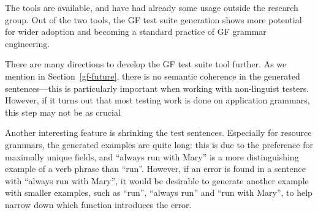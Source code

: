 
The tools are available, and have had already some usage outside the
research group. Out of the two tools, the GF test suite generation
shows more potential for wider adoption and becoming a standard
practice of GF grammar engineering.

There are many directions to develop the GF test suite tool further.
As we mention in Section~\ref{gf-future}, there is no semantic
coherence in the generated sentences---this is particularly important
when working with non-linguist testers. However, if it turns out that
most testing work is done on application grammars, this step may not
be as crucial

Another interesting feature is shrinking the test
sentences. Especially for resource grammars, the generated examples
are quite long: this is due to the preference for maximally unique
fields, and ``always run with Mary'' is a more distinguishing example
of a verb phrase than ``run''. However, if an error is found in a
sentence with ``always run with Mary'', it would be desirable to
generate another example with smaller examples, such as ``run'',
``always run'' and ``run with Mary'', to help narrow down which
function introduces the error.

